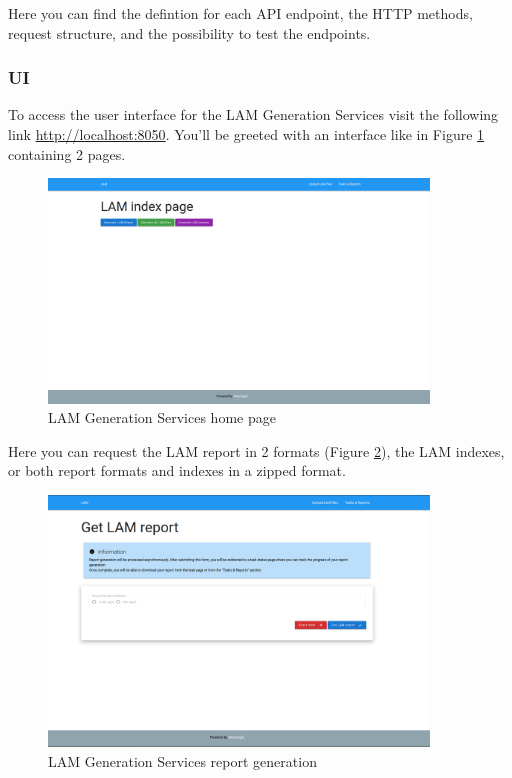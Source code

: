 Here you can find the defintion for each API endpoint, the HTTP methods, request structure, and the possibility to test the endpoints.

\subsubsection{UI}
To access the user interface for the LAM Generation Services visit the following link \url{http://localhost:8050}. You'll be greeted with an interface like in Figure \ref{fig:lam-generation-ui-home} containing 2 pages.

\begin{figure}[H]
  \centering
  \includegraphics[width=0.9\textwidth]{images/usage/lam-generation-ui-home.png}
  \caption{LAM Generation Services home page}
  \label{fig:lam-generation-ui-home}
\end{figure}

Here you can request the LAM report in 2 formats (Figure \ref{fig:lam-generation-ui-report}), the LAM indexes, or both report formats and indexes in a zipped format.

\begin{figure}[H]
  \centering
  \includegraphics[width=0.9\textwidth]{images/usage/lam-generation-ui-report.png}
  \caption{LAM Generation Services report generation}
  \label{fig:lam-generation-ui-report}
\end{figure} 

